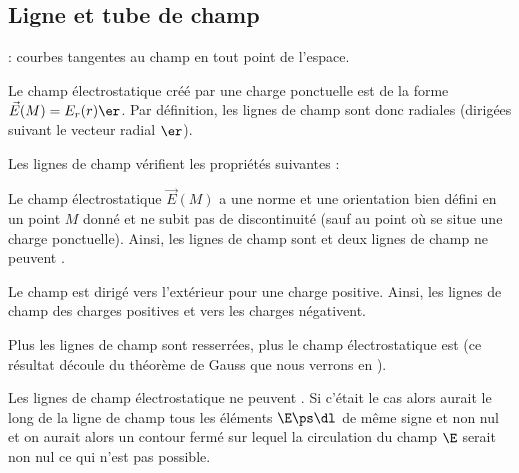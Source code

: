 \documentclass[12pt,fancy]{/Users/victor/Documents/COURS/2ACapECL/texmf/tex/latex/Preambles/cours}
\begin{document}
\subsection{Ligne et tube de champ}

\begin{definition}
 : courbes tangentes au champ en tout point de l'espace.
\end{definition}

Le champ électrostatique créé par une charge ponctuelle est de la forme $\Vec{E}(M) = E_r(r) \er$. Par définition, les lignes de champ sont donc radiales (dirigées suivant le vecteur radial $\er$).

Les lignes de champ vérifient les propriétés suivantes :
\begin{liste}
\item Le champ électrostatique $\Vec{E}(M)$ a une norme et une orientation bien défini en un point $M$ donné et ne subit pas de discontinuité (sauf au point où se situe une charge ponctuelle). Ainsi, les lignes de champ sont  et deux lignes de champ ne peuvent .
\item Le champ est dirigé vers l’extérieur pour une charge positive. Ainsi, les lignes de champ  des charges positives et  vers les charges négativent.
\item Plus les lignes de champ sont resserrées, plus le champ électrostatique est  (ce résultat découle du théorème de Gauss que nous verrons en ).
\item Les lignes de champ électrostatique ne peuvent . Si c'était le cas alors aurait le long de la ligne de champ tous les éléments $\E \ps \dl$ de même signe et non nul et on aurait alors un contour fermé sur lequel la circulation du champ $\E$ serait non nul ce qui n'est pas possible. 
\end{liste}
\end{document}
